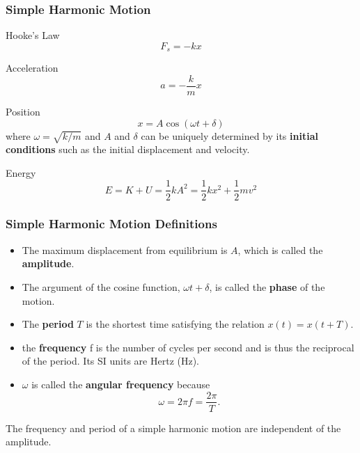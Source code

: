\documentclass[letterpaper]{beamer}
\begin{document}
\begin{frame}
\frametitle{Simple Harmonic Motion}

\begin{block}{Hooke's Law}
$$F_s = -kx$$
\end{block}

\begin{block}{Acceleration}
$$a = -\frac{k}{m}x$$
\end{block}

\begin{block}{Position}
$$x = A\cos\left(\omega t + \delta\right)$$
where $\omega = \sqrt{k/m}$ and $A$ and $\delta$ can be uniquely determined by its \textbf{initial conditions} such as the initial displacement and velocity.
\end{block}

\begin{block}{Energy}
$$E = K + U = \frac{1}{2}kA^2 = \frac{1}{2}kx^2 + \frac{1}{2}mv^2$$
\end{block}
\end{frame}

\begin{frame}
\frametitle{Simple Harmonic Motion Definitions}

\begin{itemize}
\item The maximum displacement from equilibrium is $A$, which is called the \textbf{amplitude}.
\item The argument of the cosine function, $\omega t + \delta$, is called the \textbf{phase} of the motion.
\item The \textbf{period} $T$ is the shortest time satisfying the relation $x(t) = x(t+T)$.
\item the \textbf{frequency} f is the number of cycles per second and is thus the reciprocal of the period. Its SI units are Hertz (Hz).
\item $\omega$ is called the \textbf{angular frequency} because $$\omega = 2\pi f = \frac{2\pi}{T}.$$
\end{itemize}

\alert{The frequency and period of a simple harmonic motion are independent of the amplitude.}
\end{frame}
\end{document}
